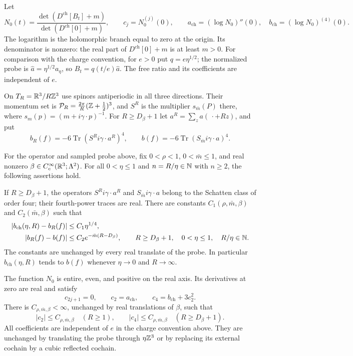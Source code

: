 Let
\begin{equation}\label{eq:response-free-ratio}
 N_0(t)=\frac{\det(D^{\mathrm{ch}}[B_t]+m)}
                  {\det(D^{\mathrm{ch}}[0]+m)},\qquad
 c_j=N_0^{(j)}(0),\qquad
 a_{\mathrm{ch}}=(\log N_0)''(0),\quad
 b_{\mathrm{ch}}=(\log N_0)^{(4)}(0).
\end{equation}
The logarithm is the holomorphic branch equal to zero at the
origin. Its denominator is nonzero: the real part of
$D^{\mathrm{ch}}[0]+m$ is at least $m>0$. For comparison
with the charge convention, for $e>0$ put $q=e\eta^{1/2}$; the normalized
probe is $\widehat a=\eta^{1/2}a_\eta$, so
$B_t=q(t/e)\widehat a$. The free ratio and its coefficients
are independent of $e$.

On $T_R=\mathbb R^3/R\mathbb Z^3$ use spinors antiperiodic in all three directions.
Their momentum set is
$\mathcal P_R=\frac{2\pi}{R}(\mathbb Z+\frac12)^3$, and
$S^R$ is the multiplier $s_{\bar m}(P)$ there, where
$s_m(p)=(m+i\gamma\cdot p)^{-1}$. For
$R\ge D_\beta+1$ let $a^R=\sum_za(\,\cdot+Rz)$, and put
\begin{equation}\label{eq:response-continuum-fourth}
 b_R(f)=-6\operatorname{Tr}(S^Ri\gamma\cdot a^R)^4,
 \qquad b(f)=-6\operatorname{Tr}(S_{\bar m}i\gamma\cdot a)^4.
\end{equation}


\begin{theorem}\label{prop:response-fourth}
For the operator and sampled probe above, fix
$0<\rho<1$, $0<\bar m\le1$, and real nonzero
$\beta\in C_c^\infty(\mathbb R^3;\Lambda^2)$.
For all $0<\eta\le1$ and $n=R/\eta\in\mathbb N$ with $n\ge2$,
the following assertions hold.

If $R\ge D_\beta+1$, the operators $S^Ri\gamma\cdot a^R$ and
$S_{\bar m}i\gamma\cdot a$ belong to the Schatten class
of order four; their fourth-power traces are real.
There are constants
$C_1(\rho,\bar m,\beta)$ and $C_2(\bar m,\beta)$ such that
\begin{align}\label{eq:response-fourth-errors}
 |b_{\mathrm{ch}}(\eta,R)-b_R(f)|&\le C_1\eta^{1/4},\notag\\
 |b_R(f)-b(f)|&\le C_2e^{-\bar m(R-D_\beta)},
 \qquad R\ge D_\beta+1,\quad0<\eta\le1,\quad R/\eta\in\mathbb N.
\end{align}
The constants are unchanged by every real translate of
the probe. In particular $b_{\mathrm{ch}}(\eta,R)$ tends
to $b(f)$ whenever $\eta\to0$ and $R\to\infty$.

The function $N_0$ is entire, even, and positive on the real axis.
Its derivatives at zero are real and satisfy
\[
 c_{2j+1}=0,\qquad c_2=a_{\mathrm{ch}},\qquad
 c_4=b_{\mathrm{ch}}+3c_2^2 .
\]
There is $C_{\rho,\bar m,\beta}<\infty$, unchanged by real
translations of $\beta$, such that
\[
 |c_2|\le C_{\rho,\bar m,\beta}\quad(R\ge1),\qquad
 |c_4|\le C_{\rho,\bar m,\beta}\quad(R\ge D_\beta+1).
\]
All coefficients are independent of $e$ in the charge convention
above. They are unchanged by translating the probe through
$\eta\mathbb Z^3$ or by replacing its external cochain by a cubic reflected
cochain.
\end{theorem}


